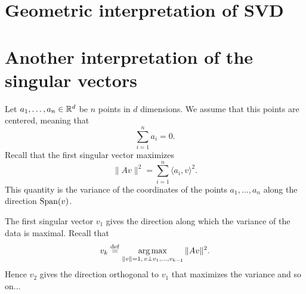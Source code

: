 \documentclass[11pt,nocut]{article}
\begin{document}

\section{Geometric interpretation of SVD}

\section{Another interpretation of the singular vectors}
Let $a_1, \dots, a_n \in \mathbb{R}^d$ be $n$ points in $d$ dimensions. We assume that this points are centered, meaning that 
$$
\sum_{i=1}^n a_i = 0.
$$
Recall that the first singular vector maximizes
$$
\|A v\|^2 =  \sum_{i=1}^n \langle a_i, v \rangle^2.
$$
This quantity is the variance of the coordinates of the points $a_1, \dots, a_n$ along the direction ${{\rm Span}}(v)$.

The first singular vector $v_1$ gives the direction along which the variance of the data is maximal. Recall that
\begin{equation}
v_{k} \overset{\rm def}{=} \operatorname*{arg\,max}_{\|v\| = 1, \, v \perp v_1, \dots, v_{k-1}} \| A v \|^2.
\end{equation}
Hence $v_2$ gives the direction orthogonal to $v_1$ that maximizes the variance and so on...

\vspace{1cm}
\centerline{}

%
%
\end{document}
